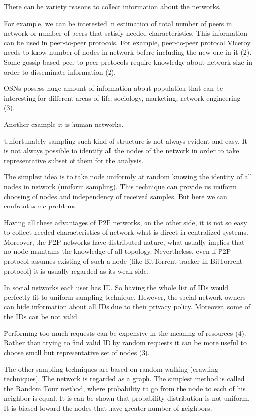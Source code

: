 \documentclass[12pt]{report}
\begin{document}
There can be variety reasons to collect information about the networks.

For example, we can be interested in estimation of total number of peers in network or number of peers that satisfy needed characteristics. This information can be used in peer-to-peer protocols. For example, peer-to-peer protocol Viceroy needs to know number of nodes in network before including the new one in it (2). Some gossip based peer-to-peer protocols require knowledge about network size in order to disseminate information (2).

OSNs possess huge amount of information about population that can be interesting for different areas of life: sociology, marketing, network engineering (3).

Another example it is human networks.

Unfortunately sampling such kind of structure is not always evident and easy. It is not always possible to identify all the nodes of the network in order to take representative subset of them for the analysis. 


The simplest idea is to take node uniformly at random knowing the identity of all nodes in network (uniform sampling). This technique can provide us uniform choosing of nodes and independency of received samples. But here we can confront some problems.

Having all these advantages of P2P networks, on the other side, it is not so easy to collect needed characteristics of network what is direct in centralized systems. Moreover, the P2P networks have distributed nature, what usually implies that no node maintains the knowledge of all topology. Nevertheless, even if P2P protocol assumes existing of such a node (like BitTorrent tracker in BitTorrent protocol) it is usually regarded as its weak side. 

In social networks each user has ID. So having the whole list of IDs would perfectly fit to uniform sampling technique. However, the social network owners can hide information about all IDs due to their privacy policy. Moreover, some of the IDs can be not valid. 

Performing too much requests can be expensive in the meaning of resources (4). Rather than trying to find valid ID by random requests it can be more useful to choose small but representative set of nodes (3).

The other sampling techniques are based on random walking (crawling techniques). The network is regarded as a graph. The simplest method is called the Random Tour method, where probability to go from the node to each of his neighbor is equal. It is can be shown that probability distribution is not uniform. It is biased toward the nodes that have greater number of neighbors. 
\end{document}
